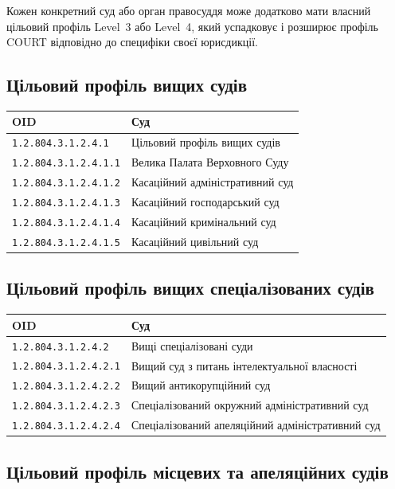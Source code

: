 Кожен конкретний суд або орган правосуддя може додатково мати власний цільовий
профіль Level~3 або Level~4, який успадковує і розширює профіль COURT відповідно
до специфіки своєї юрисдикції.

\newpage
\subsection{Цільовий профіль вищих судів}

\begin{tabular}{ll}
\textbf{OID}                 & \textbf{Суд} \\
\hline
\texttt{1.2.804.3.1.2.4.1}     & Цільовий профіль вищих судів \\
\texttt{1.2.804.3.1.2.4.1.1}   & Велика Палата Верховного Суду \\
\texttt{1.2.804.3.1.2.4.1.2}   & Касаційний адміністративний суд \\
\texttt{1.2.804.3.1.2.4.1.3}   & Касаційний господарський суд \\
\texttt{1.2.804.3.1.2.4.1.4}   & Касаційний кримінальний суд \\
\texttt{1.2.804.3.1.2.4.1.5}   & Касаційний цивільний суд \\
\end{tabular}

\subsection{Цільовий профіль вищих спеціалізованих судів}

\begin{tabular}{ll}
\textbf{OID}                 & \textbf{Суд} \\
\hline
\texttt{1.2.804.3.1.2.4.2}     & Вищі спеціалізовані суди \\
\texttt{1.2.804.3.1.2.4.2.1}   & Вищий суд з питань інтелектуальної власності \\
\texttt{1.2.804.3.1.2.4.2.2}   & Вищий антикорупційний суд \\
\texttt{1.2.804.3.1.2.4.2.3}   & Спеціалізований окружний адміністративний суд \\
\texttt{1.2.804.3.1.2.4.2.4}   & Спеціалізований апеляційний адміністративний суд \\
\end{tabular}

\subsection{Цільовий профіль місцевих та апеляційних судів}


